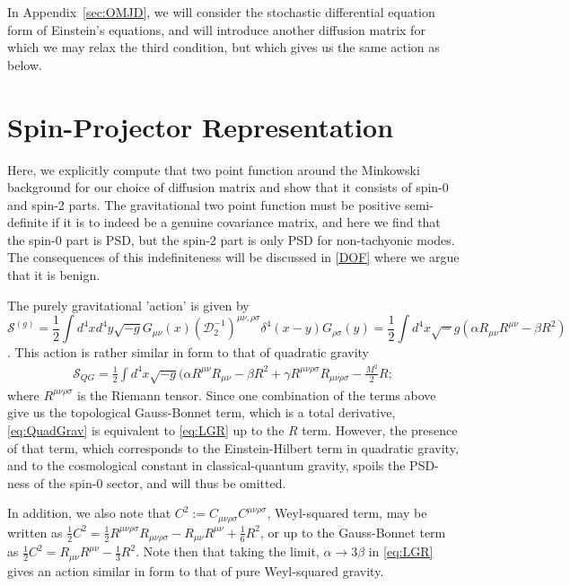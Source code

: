 \documentclass[aps,preprintnumbers,superscriptaddress,longbibliography]{revtex4-1}
\begin{document}
In {Appendix~\ref{sec:OMJD}}, we will consider the stochastic differential equation form of Einstein's equations, and will introduce another diffusion matrix for which we may relax the third condition, but which gives us the same action as below.


\section{Spin-Projector Representation}
\label{Linearized}
\label{SpinProjector}
 Here, we explicitly compute that two point function  around the Minkowski background for our choice of diffusion matrix and show that it consists of spin-0 and spin-2 parts. 
 The gravitational two point function must be positive semi-definite if it is to indeed be a genuine covariance matrix, and here we find that the spin-0 part is PSD, but the spin-2 part is  only PSD for non-tachyonic modes. The consequences of this indefiniteness will be discussed in \eqref{DOF} where we argue that it is benign. 


The purely gravitational 'action' is given by 
\begin{equation}
    \label{eq:LGR}\mathcal{S}^{(g)}=\frac{1}{2}\int d^4xd^4y\sqrt {-g} G_{\mu\nu}(x)(\mathcal{D}_2^{-1})^{\mu\nu,\rho\sigma}\delta^4(x-y)G_{\rho\sigma}(y)=\frac{1}{2}\int d^4x\sqrt -g (\alpha R_{\mu\nu}R^{\mu\nu}-\beta R^2)
\end{equation}.
This action is rather similar in form to that of quadratic gravity\cite{stelle1978classical} \cite{salvio2018quadratic}
\begin{align}
\label{eq:QuadGrav}
    \mathcal{S}_{QG}=\frac{1}{2}\int d^4x\sqrt{-g}( \alpha R^{\mu\nu}R_{\mu\nu}-\beta R^2+\gamma R^{\mu\nu\rho\sigma} R_{\mu\nu\rho\sigma}-\frac{M^2}{2}R
;\end{align} where $R^{\mu\nu\rho\sigma} $ is the Riemann tensor. Since one combination of the terms above give us the topological Gauss-Bonnet term, which is a total derivative,  \eqref{eq:QuadGrav}
is equivalent to \eqref{eq:LGR} up to the $R$ term. However, the presence of that term, which corresponds to the Einstein-Hilbert term in quadratic gravity, and to the cosmological constant in classical-quantum gravity, spoils the PSD-ness of the spin-0 sector, and will thus be omitted.

In addition, we also note that $C^2:=C_{\mu\nu\rho\sigma}C^{\mu\nu\rho\sigma}$, Weyl-squared term, may be written as $\frac{1}{2}C^2=\frac{1}{2}R^{\mu\nu\rho\sigma}R_{\mu\nu\rho\sigma}-R_{\mu\nu}R^{\mu\nu}+\frac{1}{6}R^2$, or up to the Gauss-Bonnet term as  $\frac{1}{2}C^2=R_{\mu\nu}R^{\mu\nu}-\frac{1}{3}R^2$. Note then that taking the limit, $\alpha\rightarrow3\beta$ in \eqref{eq:LGR}
gives an action similar in form to that of pure Weyl-squared gravity.
\end{document}
